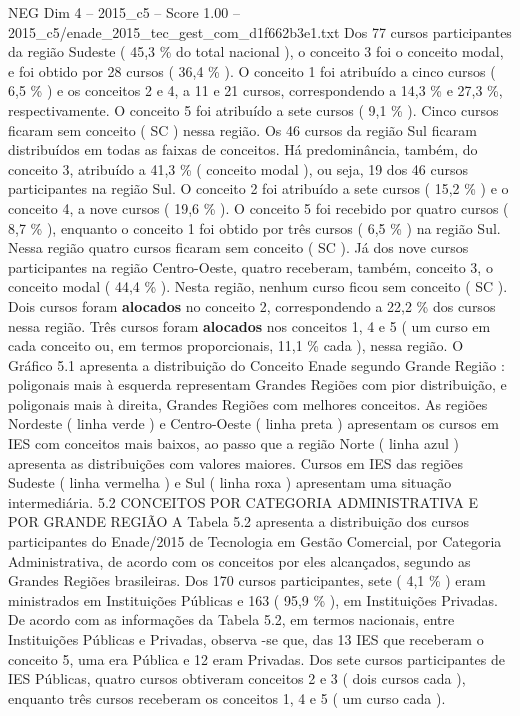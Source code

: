 \begin{textsample}{NEG Dim 4 – 2015\_c5 – Score 1.00 – 2015\_c5/enade\_2015\_tec\_gest\_com\_d1f662b3e1.txt}
Dos 77 cursos participantes da região Sudeste ( 45,3 \% do total nacional ), o conceito 3 foi o conceito modal, e foi obtido por 28 cursos ( 36,4 \% ).
O conceito 1 foi atribuído a cinco cursos ( 6,5 \% ) e os conceitos 2 e 4, a 11 e 21 cursos, correspondendo a 14,3 \% e 27,3 \%, respectivamente.
O conceito 5 foi atribuído a sete cursos ( 9,1 \% ).
Cinco cursos ficaram sem conceito ( SC ) nessa região.
Os 46 cursos da região Sul ficaram distribuídos em todas as faixas de conceitos.
Há predominância, também, do conceito 3, atribuído a 41,3 \% ( conceito modal ), ou seja, 19 dos 46 cursos participantes na região Sul.
O conceito 2 foi atribuído a sete cursos ( 15,2 \% ) e o conceito 4, a nove cursos ( 19,6 \% ).
O conceito 5 foi recebido por quatro cursos ( 8,7 \% ), enquanto o conceito 1 foi obtido por três cursos ( 6,5 \% ) na região Sul.
Nessa região quatro cursos ficaram sem conceito ( SC ).
Já dos nove cursos participantes na região Centro-Oeste, quatro receberam, também, conceito 3, o conceito modal ( 44,4 \% ).
Nesta região, nenhum curso ficou sem conceito ( SC ).
Dois cursos foram \textbf{alocados} no conceito 2, correspondendo a 22,2 \% dos cursos nessa região.
Três cursos foram \textbf{alocados} nos conceitos 1, 4 e 5 ( um curso em cada conceito ou, em termos proporcionais, 11,1 \% cada ), nessa região.
O Gráfico 5.1 apresenta a distribuição do Conceito Enade segundo Grande Região : poligonais mais à esquerda representam Grandes Regiões com pior distribuição, e poligonais mais à direita, Grandes Regiões com melhores conceitos.
As regiões Nordeste ( linha verde ) e Centro-Oeste ( linha preta ) apresentam os cursos em IES com conceitos mais baixos, ao passo que a região Norte ( linha azul ) apresenta as distribuições com valores maiores.
Cursos em IES das regiões Sudeste ( linha vermelha ) e Sul ( linha roxa ) apresentam uma situação intermediária. 5.2 CONCEITOS POR CATEGORIA ADMINISTRATIVA E POR GRANDE REGIÃO A Tabela 5.2 apresenta a distribuição dos cursos participantes do Enade/2015 de Tecnologia em Gestão Comercial, por Categoria Administrativa, de acordo com os conceitos por eles alcançados, segundo as Grandes Regiões brasileiras.
Dos 170 cursos participantes, sete ( 4,1 \% ) eram ministrados em Instituições Públicas e 163 ( 95,9 \% ), em Instituições Privadas.
De acordo com as informações da Tabela 5.2, em termos nacionais, entre Instituições Públicas e Privadas, observa -se que, das 13 IES que receberam o conceito 5, uma era Pública e 12 eram Privadas.
Dos sete cursos participantes de IES Públicas, quatro cursos obtiveram conceitos 2 e 3 ( dois cursos cada ), enquanto três cursos receberam os conceitos 1, 4 e 5 ( um curso cada ).

\end{textsample}
